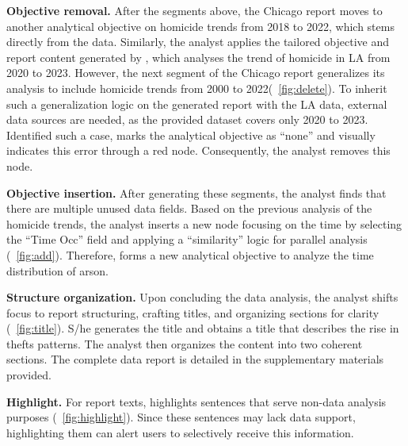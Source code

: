 \textbf{Objective removal. }
After the segments above, the Chicago report moves to another analytical objective on homicide trends from 2018 to 2022, which stems directly from the data. 
Similarly, the analyst applies the tailored objective and report content generated by \system{}, which analyses the trend of homicide in LA from 2020 to 2023. 
However, the next segment of the Chicago report generalizes its analysis to include homicide trends from 2000 to 2022(~\autoref{fig:delete}). 
To inherit such a generalization logic on the generated report with the LA data, external data sources are needed, as the provided dataset covers only 2020 to 2023. 
Identified such a case, \system{} marks the analytical objective as ``none'' and visually indicates this error through a red node. 
Consequently, the analyst removes this node.

\textbf{Objective insertion. }
After generating these segments, the analyst finds that there are multiple unused data fields. 
Based on the previous analysis of the homicide trends, the analyst inserts a new node focusing on the time by selecting the ``Time Occ'' field and applying a ``similarity'' logic for parallel analysis (~\autoref{fig:add}). 
Therefore, \system{} forms a new analytical objective to analyze the time distribution of arson. 

\textbf{Structure organization. }
Upon concluding the data analysis, the analyst shifts focus to report structuring, crafting titles, and organizing sections for clarity (~\autoref{fig:title}). 
S/he generates the title and obtains a title that describes the rise in thefts patterns. 
The analyst then organizes the content into two coherent sections. 
The complete data report is detailed in the supplementary materials provided.

\textbf{Highlight. }
For report texts, \system{} highlights sentences that serve non-data analysis purposes  (~\autoref{fig:highlight}). Since these sentences may lack data support, highlighting them can alert users to selectively receive this information.
